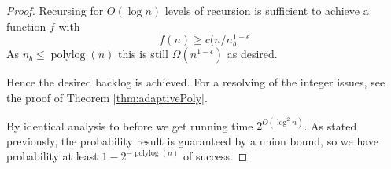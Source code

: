 \documentclass[twocolumn]{article}[10pt]
\newcommand{\defn}[1]{{\textit{\textbf{\boldmath #1}}}\xspace}
\DeclareMathOperator{\polylog}{\text{polylog}}
\DeclareMathOperator{\poly}{\text{poly}}
\newtheorem{clm}{Claim}
\begin{document}
\begin{proof}
  Recursing for $O(\log n)$ levels of recursion is sufficient to achieve a function $f$ with 
  $$f(n) \ge c(n/n_b^{1-\epsilon}$$
  As $n_b \le \polylog(n)$ this is still $\Omega(n^{1-\epsilon})$ as desired.

  Hence the desired backlog is achieved. For a resolving of the integer issues,
  see the proof of Theorem \ref{thm:adaptivePoly}.

  By identical analysis to before we get running time $2^{O(\log^2 n)}$.
  As stated previously, the probability result is guaranteed by a union bound,
  so we have probability at least $1-2^{-\polylog(n)}$ of success.
\end{proof}

\end{document}
